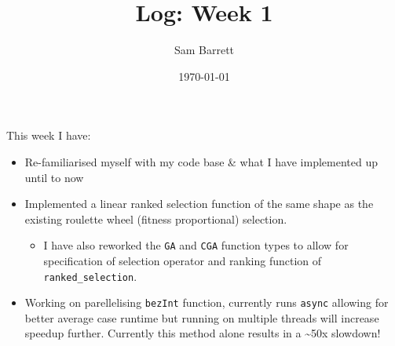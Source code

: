 \documentclass[11pt]{article}
\author{Sam Barrett}
\date{\today}
\title{Log: Week 1}
\begin{document}
\maketitle
This week I have:

\begin{itemize}
\item Re-familiarised myself with my code base \& what I have implemented up until to now
\item Implemented a linear ranked selection function of the same shape as the existing roulette wheel (fitness proportional) selection.
\begin{itemize}
\item I have also reworked the \texttt{GA} and \texttt{CGA} function types to allow for specification of selection operator and ranking function of \texttt{ranked\_selection}.
\end{itemize}
\item Working on parellelising \texttt{bezInt} function, currently runs \texttt{async} allowing for better average case runtime but running on multiple threads will increase speedup further. Currently this method alone results in a \textasciitilde{}50x slowdown!
\end{itemize}
\end{document}
